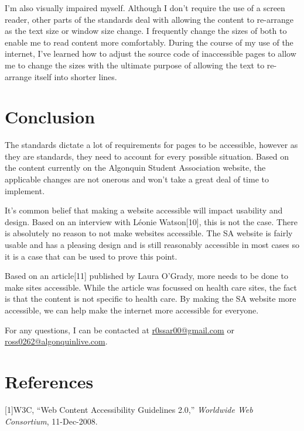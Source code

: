 \documentclass[]{article}
\begin{document}
I'm also visually impaired myself. Although I don't require the use of a
screen reader, other parts of the standards deal with allowing the
content to re-arrange as the text size or window size change. I
frequently change the sizes of both to enable me to read content more
comfortably. During the course of my use of the internet, I've learned
how to adjust the source code of inaccessible pages to allow me to
change the sizes with the ultimate purpose of allowing the text to
re-arrange itself into shorter lines.

\clearpage

\section{Conclusion}\label{conclusion}

The standards dictate a lot of requirements for pages to be accessible,
however as they are standards, they need to account for every possible
situation. Based on the content currently on the Algonquin Student
Association website, the applicable changes are not onerous and won't
take a great deal of time to implement.

It's common belief that making a website accessible will impact
usability and design. Based on an interview with Léonie Watson{[}10{]},
this is not the case. There is absolutely no reason to not make websites
accessible. The SA website is fairly usable and has a pleasing design
and is still reasonably accessible in most cases so it is a case that
can be used to prove this point.

Based on an article{[}11{]} published by Laura O'Grady, more needs to be
done to make sites accessible. While the article was focussed on health
care sites, the fact is that the content is not specific to health care.
By making the SA website more accessible, we can help make the internet
more accessible for everyone.

For any questions, I can be contacted at
\href{mailto:r0ssar00@gmail.com}{r0ssar00@gmail.com}
or\\\href{mailto:r0ssar00@gmail.com}{ross0262@algonquinlive.com}.

\clearpage

\section*{References}\label{references}

{[}1{]}W3C, ``Web Content Accessibility Guidelines 2.0,''
\emph{Worldwide Web Consortium}, 11-Dec-2008.
\end{document}
